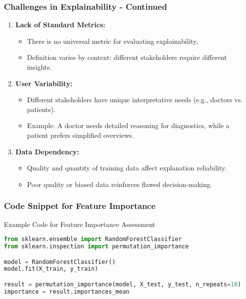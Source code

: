 \documentclass[aspectratio=169]{beamer}
\begin{document}
\begin{frame}[fragile]
    \frametitle{Challenges in Explainability - Continued}
    \begin{enumerate}[resume]
        \item \textbf{Lack of Standard Metrics:}
            \begin{itemize}
                \item There is no universal metric for evaluating explainability.
                \item Definition varies by context: different stakeholders require different insights.
            \end{itemize}
        
        \item \textbf{User Variability:}
            \begin{itemize}
                \item Different stakeholders have unique interpretative needs (e.g., doctors vs. patients).
                \item Example: A doctor needs detailed reasoning for diagnostics, while a patient prefers simplified overviews.
            \end{itemize}

        \item \textbf{Data Dependency:}
            \begin{itemize}
                \item Quality and quantity of training data affect explanation reliability.
                \item Poor quality or biased data reinforces flawed decision-making.
            \end{itemize}
    \end{enumerate}
\end{frame}

\begin{frame}[fragile]
    \frametitle{Code Snippet for Feature Importance}
    \begin{block}{Example Code for Feature Importance Assessment}
        \begin{lstlisting}[language=Python]
from sklearn.ensemble import RandomForestClassifier
from sklearn.inspection import permutation_importance

model = RandomForestClassifier()
model.fit(X_train, y_train)

result = permutation_importance(model, X_test, y_test, n_repeats=10)
importance = result.importances_mean
        \end{lstlisting}
    \end{block}
\end{frame}
\end{document}
